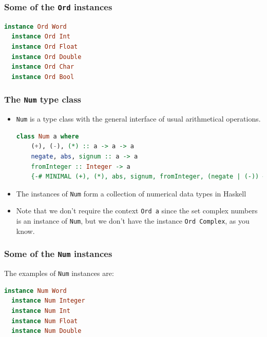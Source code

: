 \documentclass[10pt,pdf,utf8,russian,aspectratio=169]{beamer}
\begin{document}
\begin{frame}[fragile]
  \frametitle{Some of the \verb"Ord" instances}

\begin{lstlisting}[language=Haskell]
  instance Ord Word
  instance Ord Int
  instance Ord Float
  instance Ord Double
  instance Ord Char
  instance Ord Bool
\end{lstlisting}
\end{frame}

\begin{frame}[fragile]
  \frametitle{The \verb"Num" type class}

\begin{itemize}
  \item \verb"Num" is a type class with the general interface of usual arithmetical operations.
  \begin{lstlisting}[language=Haskell]
  class Num a where
    (+), (-), (*) :: a -> a -> a
    negate, abs, signum :: a -> a
    fromInteger :: Integer -> a
    {-# MINIMAL (+), (*), abs, signum, fromInteger, (negate | (-)) #-}
  \end{lstlisting}
  \item The instances of \verb"Num" form a collection of numerical data types in Haskell
  \item Note that we don't require the context \verb"Ord a" since the set complex numbers is an instance of \verb"Num", but we don't have the instance \verb"Ord Complex", as you know.
\end{itemize}
\end{frame}

\begin{frame}[fragile]
  \frametitle{Some of the \verb"Num" instances}

The examples of \verb"Num" instances are:

\begin{lstlisting}[language=Haskell]
  instance Num Word
  instance Num Integer
  instance Num Int
  instance Num Float
  instance Num Double
\end{lstlisting}
\end{frame}
\end{document}
